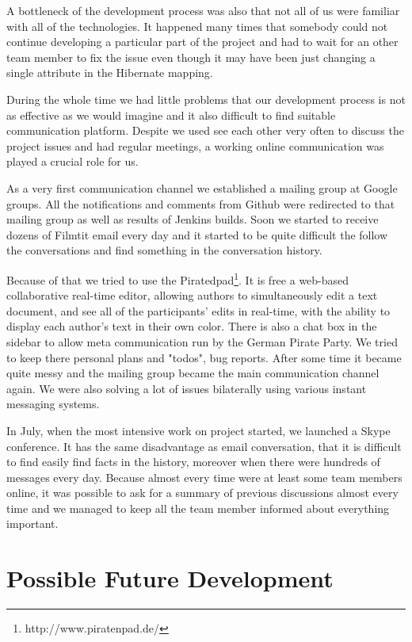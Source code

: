 A bottleneck of the development process was also that not all of us were familiar with all of the technologies. It happened many times that somebody could not continue developing a particular part of the project and had to wait for an other team member to fix the issue even though it may have been just changing a single attribute in the Hibernate mapping.

During the whole time we had little problems that our development process is not as effective as we would imagine and it also difficult to find suitable communication platform. Despite we used see each other very often to discuss the project issues and had regular meetings, a working online communication was played a crucial role for us.

As a very first communication channel we established a mailing group at Google groups. All the notifications and comments from Github were redirected to that mailing group as well as results of Jenkins builds. Soon we started to receive dozens of Filmtit email every day and it started to be quite difficult the follow the conversations and find something in the conversation history.

Because of that we tried to use the Piratedpad\footnote{http://www.piratenpad.de/}. It is free a web-based collaborative real-time editor, allowing authors to simultaneously edit a text document, and see all of the participants' edits in real-time, with the ability to display each author's text in their own color. There is also a chat box in the sidebar to allow meta communication run by the German Pirate Party. We tried to keep there personal plans and "todos", bug reports. After some time it became quite messy and the mailing group became the main communication channel again. We were also solving a lot of issues bilaterally using various instant messaging systems.

In July, when the most intensive work on project started, we launched a Skype conference. It has the same disadvantage as email conversation, that it is difficult to find easily find facts in the history, moreover when there were hundreds of messages every day. Because almost every time were at least some team members online, it was possible to ask for a summary of previous discussions almost every time and we managed to keep all the team member informed about everything important.

\section{Possible Future Development}

